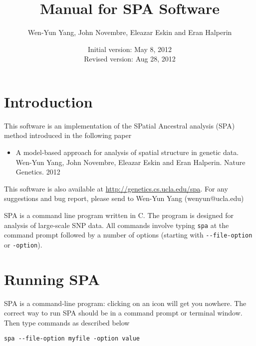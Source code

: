\documentclass[12pt]{article}
\title{Manual for SPA Software}
\author{Wen-Yun Yang, John Novembre, Eleazar Eskin and Eran Halperin}
\date{Initial version: May 8, 2012\\ Revised version: Aug 28, 2012}
\begin{document}
\maketitle

\section*{Introduction}
This software is an implementation of the SPatial Ancestral analysis (SPA) method introduced in the
following paper

\begin{itemize}
\item A model-based approach for analysis of spatial structure in genetic data. Wen-Yun Yang, John 
Novembre, Eleazar Eskin and Eran Halperin. Nature Genetics. 2012
\end{itemize}
This software is also available at \url{http://genetics.cs.ucla.edu/spa}. For any suggestions and
bug report, please send to Wen-Yun Yang (wenyun@ucla.edu)


SPA is a command line program written in C. The program is designed for analysis of large-scale SNP data.
All commands involve typing \verb+spa+ at the command prompt followed by a number of options
(starting with \verb+--file-option+ or \verb+-option+).


\section*{Running SPA}

SPA is a command-line program: clicking on an icon will get you nowhere. The correct way to run SPA
should be in a command prompt or terminal window. Then type commands as described below
\begin{verbatim}
spa --file-option myfile -option value
\end{verbatim}
\end{document}
